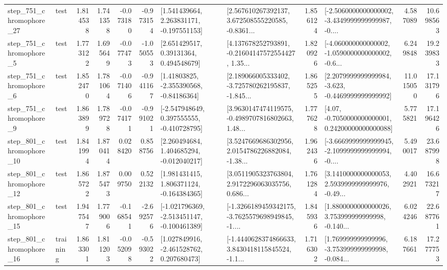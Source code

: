 \begin{tabular}{llrrrrllrlrr}
  step\_751\_chromophore\_27 &      test &      1.814538 &    1.741358 &     -0.073180 & -0.973154 &    [1.541439664, 2.263831171, -0.197551153] &  [2.567610267392137, 3.672508555220585, -0.8361... &       1.856124 &  [-2.5060000000000002, -3.4349999999999987, -0.... &            4.587089 &         10.698563 \\
   step\_751\_chromophore\_5 &      test &      1.773122 &    1.695649 &     -0.077473 & -1.050553 &      [2.651429517, 0.39131364, 0.494548679] &  [4.137678252793891, -0.21604147572554427, 1.35... &       1.820926 &  [-4.060000000000002, -1.0590000000000002, -0.6... &            6.249848 &         19.239833 \\
   step\_751\_chromophore\_6 &      test &      1.852470 &    1.781064 &     -0.071406 & -0.941167 &     [1.41803825, -2.355390568, -0.84186364] &  [2.189066005333402, -3.725780262195837, -1.845... &       1.865255 &  [2.2079999999999984, -3.623, -0.4469999999999992] &           11.015050 &         17.131796 \\
   step\_751\_chromophore\_9 &      test &      1.863899 &    1.789728 &     -0.074171 & -0.991021 &   [-2.547948649, 0.397555555, -0.410728795] &  [3.9630147474119575, -0.4989707816802663, 1.48... &       1.777628 &   [4.07, -0.7050000000000001, 0.24200000000000088] &            5.775821 &         17.196426 \\
  step\_801\_chromophore\_10 &      test &      1.841994 &    1.870414 &      0.028420 &  0.858756 &    [2.260494684, 1.404685294, -0.012040217] &  [3.5247669686302956, 2.0154786226882084, -1.38... &       1.962436 &  [-3.6669999999999945, -2.1099999999999994, -0.... &            5.490017 &         23.687998 \\
  step\_801\_chromophore\_12 &      test &      1.865722 &    1.875473 &      0.009750 &  0.522132 &    [1.981431415, 1.806371124, -0.164384365] &  [3.0511905323763804, 2.9172296063035756, 0.686... &       1.761284 &  [3.1410000000000053, 2.5939999999999976, -0.49... &            4.402921 &         16.673217 \\
  step\_801\_chromophore\_15 &      test &      1.947547 &    1.779006 &     -0.168541 & -2.692576 &  [-1.021796369, -2.513451147, -0.100461389] &  [-1.3266189459342175, -3.7625579698949845, -1.... &       1.845936 &  [1.8800000000000026, 3.753999999999998, -0.140... &            6.024246 &         22.687761 \\
  step\_801\_chromophore\_16 &  training &      1.863301 &    1.811203 &     -0.052098 & -0.593022 &    [1.027849916, -2.461528762, 0.207680473] &  [-1.4440628374866633, 3.8430418115845524, -1.1... &       1.716302 &  [1.769999999999996, -3.753999999999998, -0.084... &            6.187661 &         17.277753 \\

\end{tabular}
